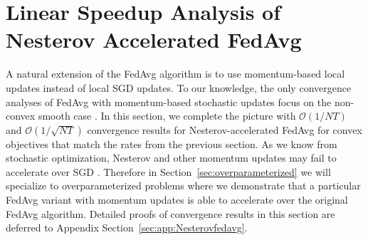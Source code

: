 


\section{Linear Speedup Analysis of Nesterov Accelerated FedAvg}
\label{sec:Nesterov}

A natural extension of the FedAvg algorithm is to use momentum-based
local updates instead of local SGD updates. To our knowledge, the
only convergence analyses of FedAvg with momentum-based stochastic
updates focus on the non-convex smooth case \cite{huo2020faster,yu2019linear,li2018federated}.
In this section, we complete the picture with $\mathcal{O}(1/NT)$
and $\mathcal{O}(1/\sqrt{NT})$ convergence results for Nesterov-accelerated
FedAvg for convex objectives that match the rates from the previous section.
As we know from stochastic optimization, Nesterov and other momentum
updates may fail to accelerate over SGD \cite{liu2018accelerating,kidambi2018insufficiency,liu2018toward,yuan2016influence}.
Therefore in Section~\ref{sec:overparameterized} we will specialize to overparameterized
problems where we demonstrate that a particular FedAvg variant with
momentum updates is able to accelerate over the original FedAvg algorithm. 
Detailed proofs of convergence results in this section are deferred to Appendix Section~\ref{sec:app:Nesterovfedavg}.

